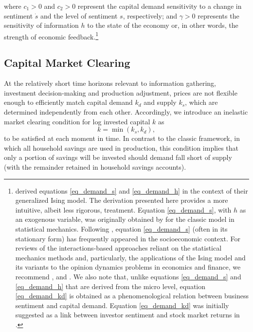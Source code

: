 \documentclass[authoryear, review]{elsarticle}
\begin{document}
where $c_1>0$ and $c_2>0$ represent the capital demand sensitivity to a change in sentiment $\dot{s}$ and the level of sentiment $s$, respectively; and $\gamma>0$ represents the sensitivity of information $h$ to the state of the economy or, in other words, the strength of economic feedback.\footnote{\citet{GusevEtAl2015} derived equations \eqref{eq_demand_s} and \eqref{eq_demand_h} in the context of their generalized Ising model. The derivation presented here provides a more intuitive, albeit less rigorous, treatment. Equation \eqref{eq_demand_s}, with $h$ as an exogenous variable, was originally obtained by \citet{SuzukiKubo1968} for the classic \citet{Ising1925} model in statistical mechanics. Following  \citet{HaagWeidlich1983}, equation \eqref{eq_demand_s} (often in its stationary form) has frequently appeared in the socioeconomic context. For reviews of the interactions-based approaches reliant on the statistical mechanics methods and, particularly, the applications of the Ising model and its variants to the opinion dynamics problems in economics and finance, we recommend \citet{BrockDurlauf2001c}, \citet{Bouchaud2013} and \citet{Slanina2013}. We also note that, unlike equations \eqref{eq_demand_s} and \eqref{eq_demand_h} that are derived from the micro level, equation \eqref{eq_demand_kd} is obtained as a phenomenological relation between business sentiment and capital demand. Equation \eqref{eq_demand_kd} was initially suggested as a link between investor sentiment and stock market returns in \citet{GusevEtAl2015}.}

\subsection{Capital Market Clearing}\label{sec_model_capmkt}
At the relatively short time horizons relevant to information gathering, investment decision-making and production adjustment, prices are not flexible enough to efficiently match capital demand $k_d$ and supply $k_s$, which are determined independently from each other. Accordingly, we introduce an inelastic market clearing condition for log invested capital $k$ as
\begin{equation}\label{eq_capmkt_clearing}
    k = \min\left(k_s,k_d\right),
\end{equation}
to be satisfied at each moment in time. In contrast to the classic framework, in which all household savings are used in production, this condition implies that only a portion of savings will be invested should demand fall short of supply (with the remainder retained in household savings accounts).
\end{document}
